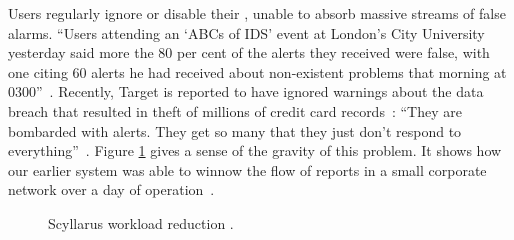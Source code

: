 Users regularly ignore or disable their {\idses}, unable to absorb
massive streams of false alarms.
``Users attending an `ABCs of IDS' event at London's City University yesterday
  said more the 80 per cent of the alerts they received were false, with one
  citing 60 alerts he had received about non-existent problems that morning at
  0300''~\cite{Register}.
Recently, Target is reported to have ignored warnings about the
data breach that resulted in theft of millions of credit
card records~\cite{TargetIgnoredIDS}:
``They are bombarded with alerts. They get so many that they just don't respond
to everything''~\cite{finkle14:_target}.
Figure
\ref{fig:workloadReduction} gives a sense of the gravity of this
problem. It shows how our earlier system was able to winnow
the 
flow of reports in a small corporate network over a day of operation~.
\begin{figure}[t]
  \centering
  \caption{Scyllarus workload reduction%
.}
  \label{fig:workloadReduction}
\end{figure}




